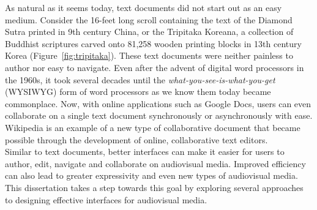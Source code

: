 As natural as it seems today, text documents did not start out as an easy medium. Consider the 16-feet long scroll containing the text of the Diamond Sutra printed in 9th century China, or the Tripitaka Koreana, a collection of Buddhist scriptures carved onto 81,258 wooden printing blocks in 13th century Korea (Figure~\ref{fig:tripitaka}). 
%
%
These text documents were neither painless to author nor easy to navigate. Even after the advent of digital word processors in the 1960s, it took several decades until the \emph{what-you-see-is-what-you-get} (WYSIWYG) form of word processors as we know them today became commonplace. Now, with online applications such as Google Docs, users can even collaborate on a single text document synchronously or asynchronously with ease. Wikipedia is an example of a new type of collaborative document that became possible through the development of online, collaborative text editors. \\

Similar to text documents, better interfaces can make it easier for users to author, edit, navigate and collaborate on audiovisual media. Improved efficiency can also lead to greater expressivity and even new types of audiovisual media. This dissertation takes a step towards this goal by exploring several approaches to designing effective interfaces for audiovisual media.

